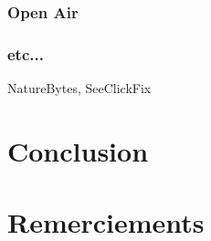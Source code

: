 \documentclass[10pt, conference, compsocconf]{llncs}
\begin{document}
		\subsubsection{Open Air}
		\subsubsection{etc...}
			 NatureBytes, SeeClickFix

\section{Conclusion}\label{sec:conclusion}

\section*{Remerciements}





\end{document}

